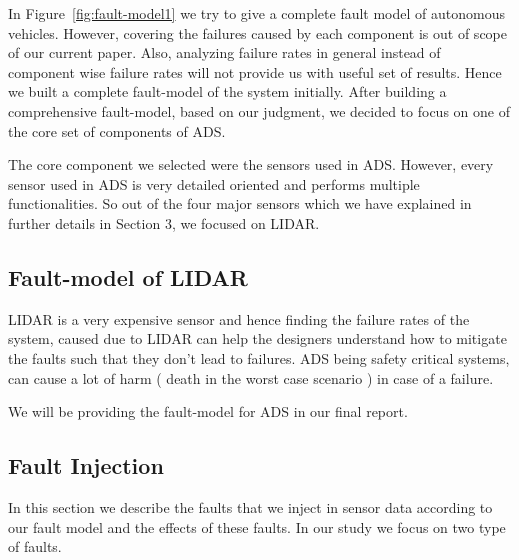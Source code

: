 In Figure~\ref{fig:fault-model1} we try to give a complete fault model of autonomous vehicles. However, covering the failures caused by each component is out of scope of our current paper. Also, analyzing failure rates in general instead of component wise failure rates will not provide us with useful set of results. Hence we built a complete fault-model of the system initially. After building a comprehensive fault-model, based on our judgment, we decided to focus on one of the core set of components of ADS.

 The core component we selected were the  sensors used in ADS. However, every sensor used in ADS is very detailed oriented and performs multiple functionalities. So out of the four major sensors which we have explained in further details in Section 3, we focused on LIDAR. 
 
 \subsection{Fault-model of LIDAR}
 LIDAR is a very expensive sensor and hence finding the failure rates of the system, caused due to LIDAR can help the designers understand how to mitigate the faults such that they don't lead to failures. ADS being safety critical systems, can cause a lot of harm ( death in the worst case scenario ) in case of a failure. 
 
 We will be providing the fault-model for ADS in our final report.
 
\subsection{Fault Injection} \label{fi_m}
In this section we describe the faults that we inject in sensor data according to our fault model and the effects of these faults. In our study we focus on two type of faults.

